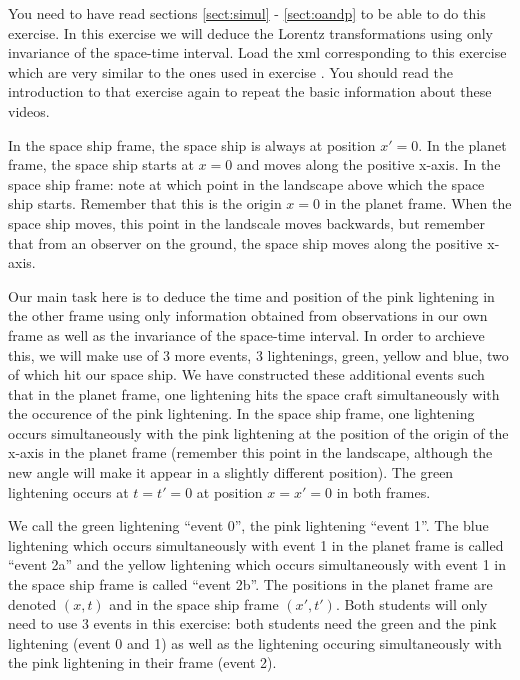 {\begin{multicols}{2}

You need to have read sections \ref{sect:simul} - \ref{sect:oandp} to be able to do this exercise. In this exercise we will deduce the Lorentz transformations using only invariance of the space-time interval. Load the xml corresponding to this exercise which are very similar to the ones used in exercise . You should read the introduction to that exercise again to repeat the basic information about these videos.

In the space ship frame, the space ship is always at position $x'=0$. In the planet frame, the space ship starts at $x=0$ and moves along the positive x-axis. In the space ship frame: note at which point in the landscape above which the space ship starts. Remember that this is the origin $x=0$ in the planet frame. When the space ship moves, this point in the landscale moves backwards, but remember that from an observer on the ground, the space ship moves along the positive x-axis.

Our main task here is to deduce the time and position of the pink lightening in the other frame using only information obtained from observations in our own frame as well as the invariance of the space-time interval. In order to archieve this, we will make use of 3 more events, 3 lightenings, green, yellow and blue, two of which hit our space ship. We have constructed these additional events such that in the planet frame, one lightening hits the space craft simultaneously with the occurence of the pink lightening. In the space ship frame, one lightening occurs simultaneously with the pink lightening at the position of the origin of the x-axis in the planet frame (remember this point in the landscape, although the new angle will make it appear in a slightly different position). The green lightening occurs at $t=t'=0$ at position $x=x'=0$ in both frames.

 We call the green lightening ``event 0'', the pink lightening ``event 1''. The blue lightening which occurs simultaneously with event 1 in the planet frame is called ``event 2a'' and the yellow lightening which occurs simultaneously with event 1 in the space ship frame is called ``event 2b''. The positions in the planet frame are denoted $(x,t)$ and in the space ship frame $(x',t')$. Both students will only need to use 3 events in this exercise: both students need the green and the pink lightening (event 0 and 1) as well as the lightening occuring simultaneously with the pink lightening in their frame (event 2).


\end{multicols}}
